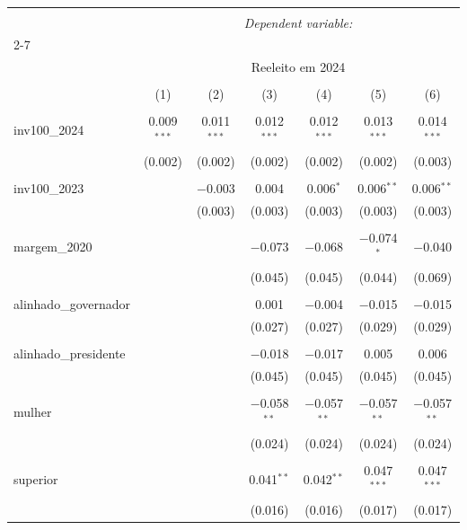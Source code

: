 
\begin{table}[!htbp] \centering 
  \caption{} 
  \label{} 
\begin{tabular}{@{\extracolsep{5pt}}lcccccc} 
\\[-1.8ex]\hline 
\hline \\[-1.8ex] 
 & \multicolumn{6}{c}{\textit{Dependent variable:}} \\ 
\cline{2-7} 
\\[-1.8ex] & \multicolumn{6}{c}{Reeleito em 2024} \\ 
\\[-1.8ex] & (1) & (2) & (3) & (4) & (5) & (6)\\ 
\hline \\[-1.8ex] 
 inv100\_2024 & 0.009$^{***}$ & 0.011$^{***}$ & 0.012$^{***}$ & 0.012$^{***}$ & 0.013$^{***}$ & 0.014$^{***}$ \\ 
  & (0.002) & (0.002) & (0.002) & (0.002) & (0.002) & (0.003) \\ 
  & & & & & & \\ 
 inv100\_2023 &  & $-$0.003 & 0.004 & 0.006$^{*}$ & 0.006$^{**}$ & 0.006$^{**}$ \\ 
  &  & (0.003) & (0.003) & (0.003) & (0.003) & (0.003) \\ 
  & & & & & & \\ 
 margem\_2020 &  &  & $-$0.073 & $-$0.068 & $-$0.074$^{*}$ & $-$0.040 \\ 
  &  &  & (0.045) & (0.045) & (0.044) & (0.069) \\ 
  & & & & & & \\ 
 alinhado\_governador &  &  & 0.001 & $-$0.004 & $-$0.015 & $-$0.015 \\ 
  &  &  & (0.027) & (0.027) & (0.029) & (0.029) \\ 
  & & & & & & \\ 
 alinhado\_presidente &  &  & $-$0.018 & $-$0.017 & 0.005 & 0.006 \\ 
  &  &  & (0.045) & (0.045) & (0.045) & (0.045) \\ 
  & & & & & & \\ 
 mulher &  &  & $-$0.058$^{**}$ & $-$0.057$^{**}$ & $-$0.057$^{**}$ & $-$0.057$^{**}$ \\ 
  &  &  & (0.024) & (0.024) & (0.024) & (0.024) \\ 
  & & & & & & \\ 
 superior &  &  & 0.041$^{**}$ & 0.042$^{**}$ & 0.047$^{***}$ & 0.047$^{***}$ \\ 
  &  &  & (0.016) & (0.016) & (0.017) & (0.017) \\ 

\end{tabular}
\end{table}
